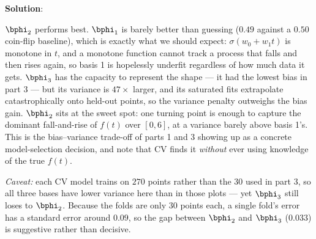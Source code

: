 \documentclass[submit]{../harvardml}
\newenvironment{solution}{
    \vspace{2mm}
    \color{blue}\noindent\textbf{Solution}:
}{}
\begin{document}
\begin{solution}
\begin{enumerate}
\noindent $\bphi_2$ performs best. $\bphi_1$ is barely better than guessing
($0.49$ against a $0.50$ coin-flip baseline), which is exactly what we should expect:
$\sigma(w_0 + w_1 t)$ is monotone in $t$, and a monotone function cannot track a
process that falls and then rises again, so basis 1 is hopelessly underfit regardless
of how much data it gets. $\bphi_3$ has the capacity to represent the shape --- it had
the lowest bias in part 3 --- but its variance is $47\times$ larger, and its saturated
fits extrapolate catastrophically onto held-out points, so the variance penalty
outweighs the bias gain. $\bphi_2$ sits at the sweet spot: one turning point is enough
to capture the dominant fall-and-rise of $f(t)$ over $[0,6]$, at a variance barely
above basis 1's. This is the bias--variance trade-off of parts 1 and 3 showing up as a
concrete model-selection decision, and note that CV finds it \emph{without} ever using
knowledge of the true $f(t)$.

\noindent\emph{Caveat:} each CV model trains on $270$ points rather than the $30$ used
in part 3, so all three bases have lower variance here than in those plots --- yet
$\bphi_3$ still loses to $\bphi_2$. Because the folds are only $30$ points each, a
single fold's error has a standard error around $0.09$, so the gap between $\bphi_2$
and $\bphi_3$ ($0.033$) is suggestive rather than decisive.

\end{enumerate}
\end{solution}


\newpage
\end{document}
